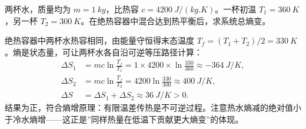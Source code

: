 \begin{exercise}
两杯水，质量均为 \(m=\SI{1}{kg}\)，比热容 \(c=\SI{4200}{J/(kg.K)}\)。一杯初温 \(T_1=\SI{360}{K}\)，另一杯 \(T_2=\SI{300}{K}\)。在绝热容器中混合达到热平衡后，求系统总熵变。
\end{exercise}
\begin{solution}
绝热容器中两杯水热容相同，由能量守恒得末态温度 \(T_f=(T_1+T_2)/2=\SI{330}{K}\)。熵是状态量，可让两杯水各自沿可逆等压路径计算：
\[
\begin{aligned}
\Delta S_1&=mc\ln\frac{T_f}{T_1}
=1\times4200\times\ln\frac{330}{360}
\approx\SI{-364}{J/K},\\
\Delta S_2&=mc\ln\frac{T_f}{T_2}
=4200\ln\frac{330}{300}
\approx\SI{+400}{J/K},\\
\Delta S&=\Delta S_1+\Delta S_2
\approx\SI{+36}{J/K}>0.
\end{aligned}
\]
结果为正，符合熵增原理：有限温差传热是不可逆过程。注意热水熵减的绝对值小于冷水熵增——这正是”同样热量在低温下贡献更大熵变”的体现。
\end{solution}



